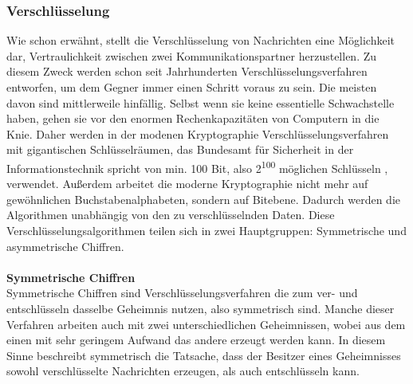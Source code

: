 \documentclass[13pt,a4paper,bibliography=totocnumbered,listof=totocnumbered]{scrartcl}
\begin{document}
\subsubsection{Verschlüsselung}
Wie schon erwähnt, stellt die Verschlüsselung von Nachrichten eine Möglichkeit dar, Vertraulichkeit zwischen zwei Kommunikationspartner herzustellen. Zu diesem Zweck werden schon seit Jahrhunderten Verschlüsselungsverfahren entworfen, um dem Gegner immer einen Schritt voraus zu sein. Die meisten davon sind mittlerweile hinfällig. Selbst wenn sie keine essentielle Schwachstelle haben, gehen sie vor den enormen Rechenkapazitäten von Computern in die Knie. Daher werden in der modenen Kryptographie Verschlüsselungsverfahren mit gigantischen Schlüsselräumen, das Bundesamt für Sicherheit in der Informationstechnik spricht von min. 100 Bit, also 2\textsuperscript{100} möglichen Schlüsseln  \cite[S. 15]{13}, verwendet. Außerdem arbeitet die moderne Kryptographie nicht mehr auf gewöhnlichen Buchstabenalphabeten, sondern auf Bitebene. Dadurch werden die Algorithmen unabhängig von den zu verschlüsselnden Daten. Diese Verschlüsselungsalgorithmen teilen sich in zwei Hauptgruppen: Symmetrische und asymmetrische Chiffren.
\\\\\textbf{Symmetrische Chiffren}\\
Symmetrische Chiffren sind Verschlüsselungsverfahren die zum ver- und entschlüsseln dasselbe Geheimnis nutzen, also symmetrisch sind. Manche dieser Verfahren arbeiten auch mit zwei unterschiedlichen Geheimnissen, wobei aus dem einen mit sehr geringem Aufwand das andere erzeugt werden kann. In diesem Sinne beschreibt symmetrisch die Tatsache, dass der Besitzer eines Geheimnisses sowohl verschlüsselte Nachrichten erzeugen, als auch entschlüsseln kann.
\end{document}
